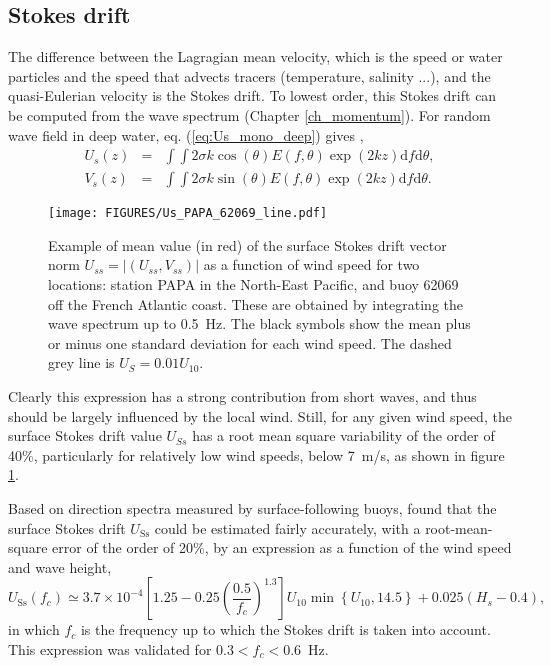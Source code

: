 \subsection{Stokes drift}
The difference between the Lagragian mean velocity, which is the speed or water particles and the speed that advects tracers (temperature, salinity ...), and the quasi-Eulerian velocity is the Stokes drift. To lowest order, this Stokes drift can be computed from the wave spectrum (Chapter \ref{ch_momentum}). For random wave field in deep water, eq. (\ref{eq:Us_mono_deep}) gives \citep{Kenyon1969},
\begin{eqnarray}
 U_s (z)&=& \int\int 2 \sigma k \cos(\theta) E(f,\theta) \exp(2kz) {\mathrm d}f {\mathrm d} \theta, \\
 V_s (z)&=& \int\int 2 \sigma k \sin(\theta) E(f,\theta) \exp(2kz) {\mathrm d}f {\mathrm d} \theta.
\end{eqnarray}
\begin{figure}[htb]
\texttt{[image: FIGURES/Us\_PAPA\_62069\_line.pdf]}
\caption{Example of mean value (in red) of the surface Stokes drift vector norm $U_{ss}=|(U_{ss},V_{ss})|$ as a function of wind speed for two locations: station PAPA in the North-East Pacific, and buoy 62069 off the French Atlantic coast. These are obtained by integrating the wave spectrum up to 0.5~Hz. The black symbols show the mean plus or minus one standard deviation for each wind speed. The dashed grey line is $U_S = 0.01 U_{10}$.   \label{fig:USU10}}
\end{figure}


Clearly this expression has a strong contribution from short waves, and thus should be largely influenced by the local wind. 
Still, for any given wind speed, the surface Stokes drift value $U_{Ss}$ has a root mean square variability of the order of 40\%, particularly for relatively low wind speeds, below 7~m/s, as shown in figure \ref{fig:USU10}.

Based on direction spectra measured by surface-following buoys, 
\cite{Ardhuin&al.2009} found that the surface Stokes drift  $U_{\mathrm{Ss}}$ could be estimated fairly accurately, with a root-mean-square error of the order of 20\%, by an expression as a function of the wind speed and wave height, 
\begin{equation}
U_{\mathrm{Ss}}(f_c)\simeq 3.7\times 10^{-4}
\left[1.25-0.25\left(\frac{0.5}{f_c}\right)^{1.3}\right] U_{10}
 \min\left\{U_{10},14.5\right\} + 0.025\left(
H_s-0.4\right),\label{Uss_U10}
\end{equation}
in which  $f_c$ is the frequency up to which the Stokes drift is taken into account. This 
expression was validated for $0.3<f_c<0.6$~Hz. 




